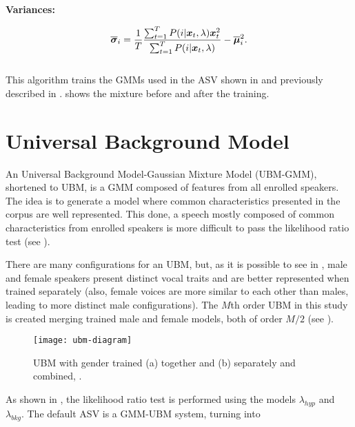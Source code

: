 \noindent\textbf{Variances:}

\begin{equation}
    \overline{\dvec{\sigma}}_i = \frac{1}{T} \frac{\sum_{t=1}^T \postprob{i}{\dvec{x}_t, \lambda} \dvec{x}_t^2}{\sum_{t=1}^T \postprob{i}{\dvec{x}_t, \lambda}} - \overline{\dvec{\mu}}_i^2.
    \label{eq:m-step-means}
\end{equation}
\\

This algorithm trains the GMMs used in the ASV shown in  and previously described in .  shows the mixture before and after the training.

\section{Universal Background Model}
\label{sec:ubm}

An Universal Background Model-Gaussian Mixture Model (UBM-GMM), shortened to UBM, is a GMM composed of features from all enrolled speakers. The idea is to generate a model where common characteristics presented in the corpus are well represented. This done, a speech mostly composed of common characteristics from enrolled speakers is more difficult to pass the likelihood ratio test (see ).

There are many configurations for an UBM, but, as it is possible to see in , male and female speakers present distinct vocal traits and are better represented when trained separately (also, female voices are more similar to each other than males, leading to more distinct male configurations). The $M$th order UBM in this study is created merging trained male and female models, both of order $M/2$ (see ).

\begin{figure}[ht]
    \centering
    \texttt{[image: ubm-diagram]}
    \caption{UBM with gender trained (a) together and (b) separately and combined, .}
    \label{fig:ubm-diagram}
\end{figure}

As shown in , the likelihood ratio test is performed using the models $\lambda_{hyp}$ and $\lambda_{bkg}$. The default ASV is a GMM-UBM system, turning  into

